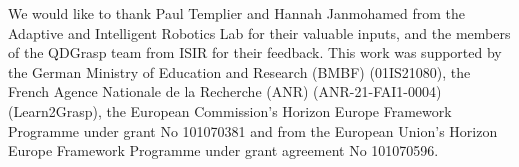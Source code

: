 We would like to thank Paul Templier and Hannah Janmohamed from the Adaptive and Intelligent Robotics Lab for their valuable inputs, and the members of the QDGrasp team from ISIR for their feedback. This work was supported by the German Ministry of Education and Research (BMBF) (01IS21080), the French Agence Nationale de la Recherche (ANR) (ANR-21-FAI1-0004) (Learn2Grasp), the European Commission's Horizon Europe Framework Programme under grant No 101070381 and from the European Union's Horizon Europe Framework Programme under grant agreement No 101070596.
